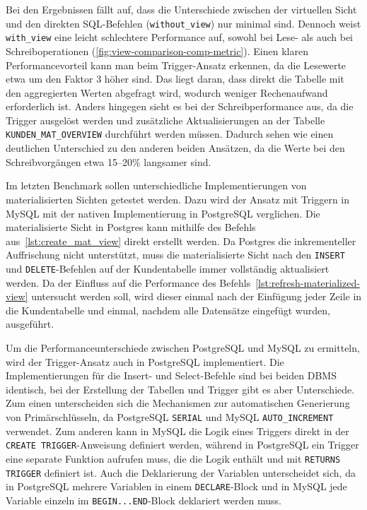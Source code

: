 Bei den Ergebnissen fällt auf, dass die Unterschiede zwischen der virtuellen Sicht und den direkten SQL-Befehlen (\texttt{without\_view}) nur minimal sind.
Dennoch weist \texttt{with\_view} eine leicht schlechtere Performance auf, sowohl bei Lese- als auch bei Schreiboperationen (\ref{fig:view-comparison-comp-metric}).
Einen klaren Performancevorteil kann man beim Trigger-Ansatz erkennen, da die Lesewerte etwa um den Faktor 3 höher sind.
Das liegt daran, dass direkt die Tabelle mit den aggregierten Werten abgefragt wird, wodurch weniger Rechenaufwand erforderlich ist.
Anders hingegen sieht es bei der Schreibperformance aus, da die Trigger ausgelöst werden und zusätzliche Aktualisierungen an der Tabelle \texttt{KUNDEN\_MAT\_OVERVIEW} durchführt werden müssen.
Dadurch sehen wie einen deutlichen Unterschied zu den anderen beiden Ansätzen, da die Werte bei den Schreibvorgängen etwa 15--20\% langsamer sind.

Im letzten Benchmark sollen unterschiedliche Implementierungen von materialisierten Sichten getestet werden.
Dazu wird der Ansatz mit Triggern in MySQL mit der nativen Implementierung in PostgreSQL verglichen.
Die materialisierte Sicht in Postgres kann mithilfe des Befehls aus~\ref{lst:create_mat_view} direkt erstellt werden.
Da Postgres die inkrementeller Auffrischung nicht unterstützt, muss die materialisierte Sicht nach den \texttt{INSERT} und \texttt{DELETE}-Befehlen auf der Kundentabelle immer vollständig aktualisiert werden.
Da der Einfluss auf die Performance des Befehls~\ref{lst:refresh-materialized-view} untersucht werden soll, wird dieser einmal nach der Einfügung jeder Zeile in die Kundentabelle und einmal, nachdem alle Datensätze eingefügt wurden, ausgeführt.

Um die Performanceunterschiede zwischen PostgreSQL und MySQL zu ermitteln, wird der Trigger-Ansatz auch in PostgreSQL implementiert.
Die Implementierungen für die Insert- und Select-Befehle sind bei beiden DBMS identisch, bei der Erstellung der Tabellen und Trigger gibt es aber Unterschiede.
Zum einen unterscheiden sich die Mechanismen zur automatischen Generierung von Primärschlüsseln, da PostgreSQL \texttt{SERIAL} und MySQL \texttt{AUTO\_INCREMENT} verwendet.
Zum anderen kann in MySQL die Logik eines Triggers direkt in der \texttt{CREATE TRIGGER}-Anweisung definiert werden, während in PostgreSQL ein Trigger eine separate Funktion aufrufen muss, die die Logik enthält und mit \texttt{RETURNS TRIGGER} definiert ist.
Auch die Deklarierung der Variablen unterscheidet sich, da in PostgreSQL mehrere Variablen in einem \texttt{DECLARE}-Block und in MySQL jede Variable einzeln im \texttt{BEGIN...END}-Block deklariert werden muss.

